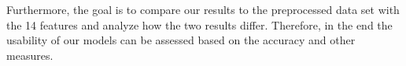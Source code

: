 \documentclass[11pt,titlepage,oneside,openany]{book}
\begin{document}
Furthermore, the goal is to compare our results to the preprocessed data set with the 14 features and analyze how the two results differ. Therefore, in the end the usability of our models can be assessed based on the accuracy and other measures. 

\vspace{2cm}
\begin{small}
  \printbibliography
\end{small}

\pagestyle{plain}
\end{document}

